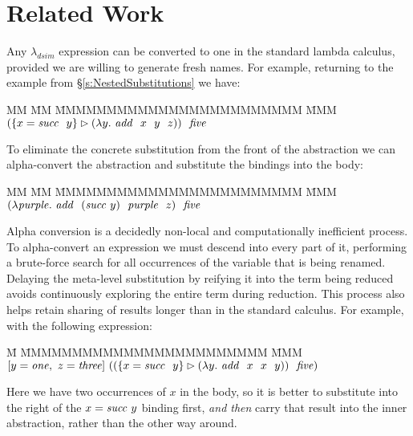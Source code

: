 
\section{Related Work}

Any $\lambda_{dsim}$ expression can be converted to one in the standard lambda calculus, provided we are willing to generate fresh names. For example, returning to the example from \S\ref{s:NestedSubstitutions} we have:
\begin{tabbing}
MM      \= MM \= MMMMMMMMMMMMMMMMMMMMMMMM \= MMM \kill
        \> $(\{x = \mathit{succ}~~ y\} \rhd (\lambda y.~ \mathit{add}~~ x~~ y~~ z))~~ \mathit{five}$
\end{tabbing}

To eliminate the concrete substitution from the front of the abstraction we can alpha-convert the abstraction and substitute the bindings into the body:
\begin{tabbing}
MM      \= MM \= MMMMMMMMMMMMMMMMMMMMMMMM \= MMM \kill
        \> $(\lambda \mathit{purple}.~ \mathit{add}~~ (\mathit{succ}~ y)~~ \mathit{purple}~~ z)~~ \mathit{five}$
\end{tabbing}

Alpha conversion is a decidedly non-local and computationally inefficient process. To alpha-convert an expression we must descend into every part of it, performing a brute-force search for all occurrences of the variable that is being renamed. Delaying the meta-level substitution by reifying it into the term being reduced avoids continuously exploring the entire term during reduction. This process also helps retain sharing of results longer than in the standard calculus. For example, with the following expression:
\begin{tabbing}
\= M \= MMMMMMMMMMMMMMMMMMMMMMMM \= MMM \kill
        \> 
        \> $[y = \mathit{one},~ z = \mathit{three}] 
                ~((\{x = \mathit{succ}~~ y\} \rhd (\lambda y.~ \mathit{add}~~ x~~ x~~ y))~~ \mathit{five})$
\end{tabbing}

Here we have two occurrences of $x$ in the body, so it is better to substitute into the right of the $x = \mathit{succ}~ y$ binding first, \emph{and then} carry that result into the inner abstraction, rather than the other way around.


